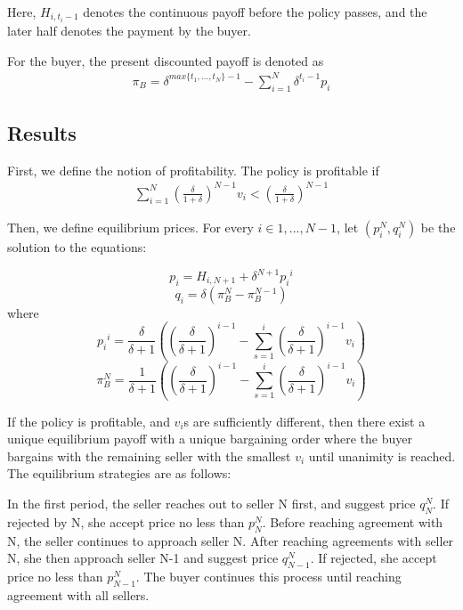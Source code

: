 \documentclass[ProjectGAZ]{subfiles}
\begin{document}
Here, $H_{i, t_i-1}$ denotes the continuous payoff before the policy passes, and the later half denotes the payment by the buyer.

For the buyer, the present discounted payoff is denoted as 
\begin{align}
\pi_B = \delta^{max\{t_1, ..., t_N\} - 1} - \sum_{i=1}^{N}\delta^{t_i-1}p_i \label{eq:XiaoBPO}
\end{align}

\subsection{Results}\label{subsec:Xiao-Results}

First, we define the notion of profitability. The policy is profitable if 
\begin{align}
	\sum_{i=1}^{N} (\frac{\delta}{1+\delta})^{N-1} v_i < (\frac{\delta}{1+\delta})^{N-1} \label{eq:XiaoProfitable}
\end{align}

Then, we define equilibrium prices. For every $i \in {1, ..., N-1}$, let $(p_i^N, q_i^N)$ be the solution to the equations:

\begin{equation}
	p_i = H_{i, N+1} + \delta^{N+1}{p_i}^i 
\end{equation}
\begin{equation}
	q_i = \delta(\pi_B^{N} - \pi_B^{N-1})
\end{equation}
where 
\begin{equation}
	{p_i}^i = \frac{\delta}{\delta+1}((\frac{\delta}{\delta+1})^{i-1} - \sum_{s=1}^{i}(\frac{\delta}{\delta +1})^{i-1}v_i)
\end{equation}
\begin{equation}
	\pi_B^N = \frac{1}{\delta+1}((\frac{\delta}{\delta+1})^{i-1} - \sum_{s=1}^{i}(\frac{\delta}{\delta +1})^{i-1}v_i)
\end{equation}

If the policy is profitable, and $v_i$s are sufficiently different, then there exist a unique equilibrium payoff with a unique bargaining order where the buyer bargains with the remaining seller with the smallest $v_i$ until unanimity is reached. The equilibrium strategies are as follows:

In the first period, the seller reaches out to seller N first, and suggest price $q_N^N$. If rejected by N, she accept price no less than $p_N^N$. Before reaching agreement with N, the seller continues to approach seller N. After reaching agreements with seller N, she then approach seller N-1 and suggest price $q_{N-1}^N$. If rejected, she accept price no less than $p_{N-1}^N$. The buyer continues this process until reaching agreement with all sellers.
\end{document}
